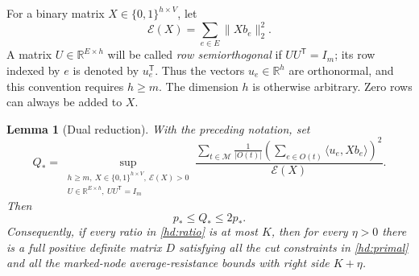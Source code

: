 \documentclass[11pt]{amsart}
\newtheorem{lemma}[theorem]{Lemma}
\theoremstyle{definition}
\theoremstyle{remark}
\numberwithin{equation}{section}
\begin{document}
For a binary matrix $X\in\{0,1\}^{h\times V}$, let
\[
 \mathcal E(X)=\sum_{e\in E}\|Xb_e\|_2^2.
\]
A matrix $U\in\mathbb R^{E\times h}$ will be called
\emph{row semiorthogonal} if $UU^{\mathsf T}=I_m$; its row indexed by
$e$ is denoted by $u_e^{\mathsf T}$.  Thus the vectors $u_e\in\mathbb R^h$
are orthonormal, and this convention requires $h\geq m$.  The dimension
$h$ is otherwise arbitrary.  Zero rows can always be added to $X$.

\begin{lemma}[Dual reduction]
\label{lem:hierarchy-dual}
With the preceding notation, set
\begin{equation}
\label{hd:ratio}
 Q_*=
 \sup_{\substack{h\geq m,\ X\in\{0,1\}^{h\times V},\ \mathcal E(X)>0\\
                  U\in\mathbb R^{E\times h},\ UU^{\mathsf T}=I_m}}
 \frac{\displaystyle
       \sum_{t\in\mathcal M}\frac1{|O(t)|}
       \left(\sum_{e\in O(t)}\langle u_e,Xb_e\rangle\right)^2}
      {\mathcal E(X)}.
\end{equation}
Then
\begin{equation}
\label{hd:comparison}
 p_*\leq Q_*\leq2p_*.
\end{equation}
Consequently, if every ratio in \eqref{hd:ratio} is at most $K$, then for
every $\eta>0$ there is a full positive definite matrix $D$ satisfying
all the cut constraints in \eqref{hd:primal} and all the marked-node
average-resistance bounds with right side $K+\eta$.
\end{lemma}
\end{document}
